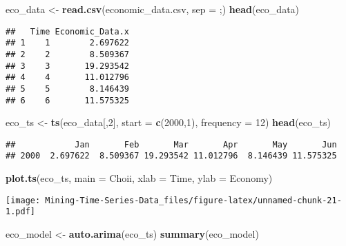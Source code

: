 \documentclass[
]{article}
\newenvironment{Shaded}{\begin{snugshade}}{\end{snugshade}}
\newcommand{\AttributeTok}[1]{\textcolor[rgb]{0.13,0.29,0.53}{#1}}
\newcommand{\DecValTok}[1]{\textcolor[rgb]{0.00,0.00,0.81}{#1}}
\newcommand{\FunctionTok}[1]{\textcolor[rgb]{0.13,0.29,0.53}{\textbf{#1}}}
\newcommand{\NormalTok}[1]{#1}
\newcommand{\OtherTok}[1]{\textcolor[rgb]{0.56,0.35,0.01}{#1}}
\newcommand{\StringTok}[1]{\textcolor[rgb]{0.31,0.60,0.02}{#1}}
\begin{document}
\begin{Shaded}
\begin{Highlighting}[]
\NormalTok{eco\_data }\OtherTok{\textless{}{-}} \FunctionTok{read.csv}\NormalTok{(}\StringTok{\textquotesingle{}economic\_data.csv\textquotesingle{}}\NormalTok{, }\AttributeTok{sep =} \StringTok{\textquotesingle{};\textquotesingle{}}\NormalTok{)}
\FunctionTok{head}\NormalTok{(eco\_data)}
\end{Highlighting}
\end{Shaded}

\begin{verbatim}
##   Time Economic_Data.x
## 1    1        2.697622
## 2    2        8.509367
## 3    3       19.293542
## 4    4       11.012796
## 5    5        8.146439
## 6    6       11.575325
\end{verbatim}

\begin{Shaded}
\begin{Highlighting}[]
\NormalTok{eco\_ts }\OtherTok{\textless{}{-}} \FunctionTok{ts}\NormalTok{(eco\_data[,}\DecValTok{2}\NormalTok{], }\AttributeTok{start =} \FunctionTok{c}\NormalTok{(}\DecValTok{2000}\NormalTok{,}\DecValTok{1}\NormalTok{), }\AttributeTok{frequency =} \DecValTok{12}\NormalTok{)}
\FunctionTok{head}\NormalTok{(eco\_ts)}
\end{Highlighting}
\end{Shaded}

\begin{verbatim}
##            Jan       Feb       Mar       Apr       May       Jun
## 2000  2.697622  8.509367 19.293542 11.012796  8.146439 11.575325
\end{verbatim}

\begin{Shaded}
\begin{Highlighting}[]
\FunctionTok{plot.ts}\NormalTok{(eco\_ts, }\AttributeTok{main =} \StringTok{\textquotesingle{}Choii\textquotesingle{}}\NormalTok{, }\AttributeTok{xlab =} \StringTok{\textquotesingle{}Time\textquotesingle{}}\NormalTok{, }\AttributeTok{ylab =} \StringTok{\textquotesingle{}Economy\textquotesingle{}}\NormalTok{)}
\end{Highlighting}
\end{Shaded}

\texttt{[image: Mining-Time-Series-Data\_files/figure-latex/unnamed-chunk-21-1.pdf]}

\begin{Shaded}
\begin{Highlighting}[]
\NormalTok{eco\_model }\OtherTok{\textless{}{-}} \FunctionTok{auto.arima}\NormalTok{(eco\_ts)}
\FunctionTok{summary}\NormalTok{(eco\_model)}
\end{Highlighting}
\end{Shaded}
\end{document}
